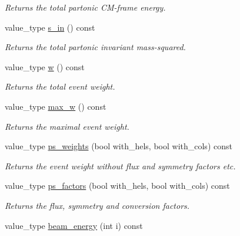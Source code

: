 \begin{DoxyCompactItemize}
\begin{DoxyCompactList}\small\item\em Returns the total partonic C\+M-\/frame energy. \end{DoxyCompactList}\item 
\hypertarget{a00212_acc0a51d8603cd16108f669c11b2c3f2b}{}value\+\_\+type \hyperlink{a00212_acc0a51d8603cd16108f669c11b2c3f2b}{s\+\_\+in} () const \label{a00212_acc0a51d8603cd16108f669c11b2c3f2b}

\begin{DoxyCompactList}\small\item\em Returns the total partonic invariant mass-\/squared. \end{DoxyCompactList}\item 
\hypertarget{a00212_a639c007c5544b462c28c46c0fc5e0694}{}value\+\_\+type \hyperlink{a00212_a639c007c5544b462c28c46c0fc5e0694}{w} () const \label{a00212_a639c007c5544b462c28c46c0fc5e0694}

\begin{DoxyCompactList}\small\item\em Returns the total event weight. \end{DoxyCompactList}\item 
\hypertarget{a00212_a95492c5d162bfda7859f161110692d08}{}value\+\_\+type \hyperlink{a00212_a95492c5d162bfda7859f161110692d08}{max\+\_\+w} () const \label{a00212_a95492c5d162bfda7859f161110692d08}

\begin{DoxyCompactList}\small\item\em Returns the maximal event weight. \end{DoxyCompactList}\item 
value\+\_\+type \hyperlink{a00212_abf627ab0d6ee6b3124049fd60096be54}{ps\+\_\+weights} (bool with\+\_\+hels, bool with\+\_\+cols) const 
\begin{DoxyCompactList}\small\item\em Returns the event weight without flux and symmetry factors etc. \end{DoxyCompactList}\item 
value\+\_\+type \hyperlink{a00212_a7dcc2b237825ce0f930c02513a31a24c}{ps\+\_\+factors} (bool with\+\_\+hels, bool with\+\_\+cols) const 
\begin{DoxyCompactList}\small\item\em Returns the flux, symmetry and conversion factors. \end{DoxyCompactList}\item 
\hypertarget{a00212_a8387e14e09be662bc515d9429ef941a1}{}value\+\_\+type \hyperlink{a00212_a8387e14e09be662bc515d9429ef941a1}{beam\+\_\+energy} (int i) const \label{a00212_a8387e14e09be662bc515d9429ef941a1}


\end{DoxyCompactItemize}
